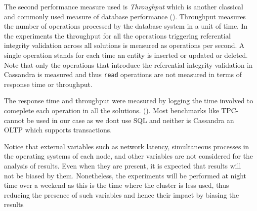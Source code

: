 The second performance measure used is \textit{Throughput} which is another
classical and commonly used measure of database performance ().
Throughput measures the number of operations processed by the database system in
a unit of time. In the experiments the throughput for all the operations
triggering referential integrity validation across all solutions is measured as
operations per second.
A single operation stands for each time an entity is inserted or updated or
deleted.
Note that only the operations that introduce the referential integrity
validation in Cassandra is measured and thus \texttt{read} operations are not
measured in terms of response time or
throughput.


The response time and throughput were measured by logging the time involved to
comeplete each operation in all the solutions. 
(). Most benchmarks like TPC- cannot be used in our
case as we dont use SQL and neither is Cassandra an OLTP which supports transactions.

Notice that external variables such as network latency, simultaneous processes
in the operating systems of each node, and other variables are not considered
for the analysis of results. Even when they are present, it is expected that
results will not be biased by them. Nonetheless, the experiments will be
performed at night time over a weekend as this is the time where the cluster is
less used, thus reducing the presence of such variables and hence their impact
by biasing the results 

